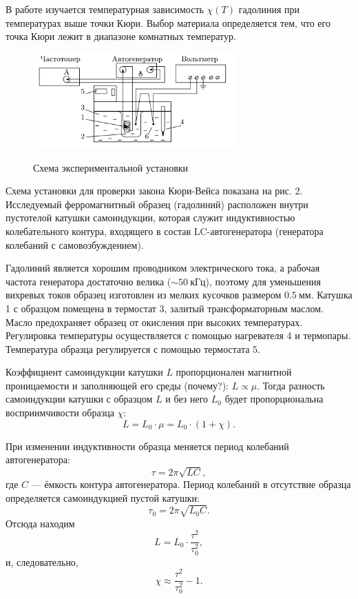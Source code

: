 \documentclass[12pt,a4paper]{article}
\begin{document}
В работе изучается температурная зависимость $\chi(T)$ гадолиния при
температурах выше точки Кюри. Выбор материала определяется тем,
что его точка Кюри лежит в диапазоне комнатных температур.
\begin{figure}[h!]
	\begin{center}
		\includegraphics[width = 0.7\textwidth]{ust.png}
		\label{fig:facility}
        \caption{ Схема экспериментальной установки}
	\end{center}
\end{figure}

Схема установки для проверки закона Кюри-Вейса показана на рис. 2. Исследуемый ферромагнитный образец (гадолиний) расположен внутри пустотелой катушки самоиндукции, которая служит индуктивностью колебательного контура, входящего в состав LC-автогенератора (генератора колебаний с самовозбуждением).

Гадолиний является хорошим проводником электрического тока, а рабочая частота генератора достаточно велика (\(\sim 50\ \text{кГц}\)), поэтому для уменьшения вихревых токов образец изготовлен из мелких кусочков размером \(0.5\ \text{мм}\). Катушка 1 с образцом помещена в термостат 3, залитый трансформаторным маслом. Масло предохраняет образец от окисления при высоких температурах. Регулировка температуры осуществляется с помощью нагревателя 4 и термопары. Температура образца регулируется с помощью термостата 5.

Коэффициент самоиндукции катушки \(L\) пропорционален магнитной проницаемости и заполняющей его среды (почему?): \(L \propto \mu\). Тогда разность самоиндукции катушки с образцом \(L\) и без него \(L_0\) будет пропорциональна восприимчивости образца \(\chi\):
\[
L = L_0 \cdot \mu = L_0 \cdot (1 + \chi).
\]

При изменении индуктивности образца меняется период колебаний автогенератора:
\[
\tau = 2 \pi \sqrt{LC},
\]
где \(C\) — ёмкость контура автогенератора. Период колебаний в отсутствие образца определяется самоиндукцией пустой катушки:
\[
\tau_0 = 2 \pi \sqrt{L_0 C}.
\]
Отсюда находим
\[
L = L_0 \cdot \frac{\tau^2}{\tau_0^2},
\]
и, следовательно,
\[
\chi \approx \frac{\tau^2}{\tau_0^2} - 1. \tag{3}
\]
\end{document}
